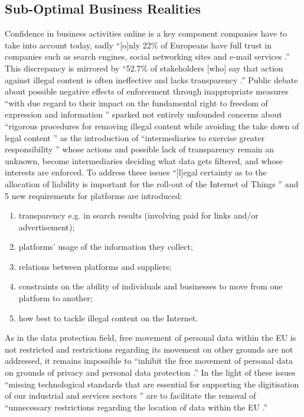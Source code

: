 \documentclass[a4paper]{article}
\begin{document}
\subsection{Sub-Optimal Business Realities} 

Confidence in business activities online is a key component companies have to take into account today, sadly ``[o]nly 22\% of Europeans have full trust in companies such as search engines, social networking sites and e-mail services \cite{DSM}.'' This discrepancy is mirrored by ``52.7\% of stakeholders [who] say that action against illegal content is often ineffective and lacks transparency \cite{DSM}.'' Public debate about possible negative effects of enforcement through inappropriate measures ``with due regard to their impact on the fundamental right to freedom of expression and information \cite{DSM}'' sparked not entirely unfounded concerns about ``rigorous procedures for removing illegal content while avoiding the take down of legal content \cite{DSM}'' as the introduction of ``intermediaries to exercise greater responsibility \cite{DSM}'' whose actions and possible lack of transparency remain an unknown, become intermediaries deciding what data gets filtered, and whose interests are enforced. To address these issues ``[l]egal certainty as to the allocation of liability is important for the roll-out of the Internet of Things \cite{DSM}'' and 5 new requirements for platforms are introduced: 
\begin{enumerate}
\item transparency e.g. in search results (involving paid for links and/or advertisement);
\item platforms' usage of the information they collect;
\item relations between platforms and suppliers;
\item constraints on the ability of individuals and businesses to move from one platform to another;
\item how best to tackle illegal content on the Internet.
\end{enumerate} 

\noindent
As in the data protection field, free movement of personal data within the EU is not restricted and restrictions regarding its movement on other grounds are not addressed, it remains impossible to ``inhibit the free movement of personal data on grounds of privacy and personal data protection \cite{DSM}.'' In the light of these issues ``missing technological standards that are essential for supporting the digitisation of our industrial and services sectors \cite{DSM}'' are to facilitate the removal of ``unnecessary restrictions regarding the location of data within the EU \cite{DSM}.'' 
\end{document}
